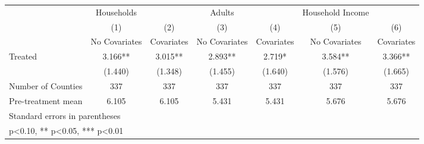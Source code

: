 {
\def\sym#1{\ifmmode^{#1}\else\(^{#1}\)\fi}
\begin{tabular}{l*{6}{c}}
\hline\hline
            &  Households   &               &      Adults   &               &Household Income   &               \\
            &\multicolumn{1}{c}{(1)}&\multicolumn{1}{c}{(2)}&\multicolumn{1}{c}{(3)}&\multicolumn{1}{c}{(4)}&\multicolumn{1}{c}{(5)}&\multicolumn{1}{c}{(6)}\\
            &\multicolumn{1}{c}{No Covariates}&\multicolumn{1}{c}{Covariates}&\multicolumn{1}{c}{No Covariates}&\multicolumn{1}{c}{Covariates}&\multicolumn{1}{c}{No Covariates}&\multicolumn{1}{c}{Covariates}\\
\hline
Treated     &       3.166** &       3.015** &       2.893** &       2.719*  &       3.584** &       3.366** \\
            &     (1.440)   &     (1.348)   &     (1.455)   &     (1.640)   &     (1.576)   &     (1.665)   \\
\hline
Number of Counties&         337   &         337   &         337   &         337   &         337   &         337   \\
Pre-treatment mean&       6.105   &       6.105   &       5.431   &       5.431   &       5.676   &       5.676   \\
\hline\hline
\multicolumn{7}{l}{\footnotesize Standard errors in parentheses}\\
\multicolumn{7}{l}{\footnotesize * p<0.10, ** p<0.05, *** p<0.01}\\
\end{tabular}
}
